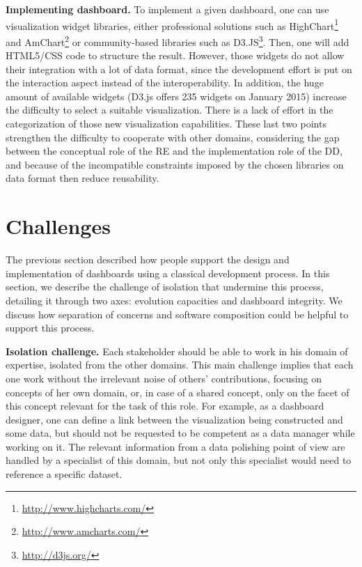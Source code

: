 \documentclass{acm_proc_article-sp}
\begin{document}
\textbf{Implementing dashboard.}
To implement a given dashboard, one can use visualization widget
libraries, either professional solutions such as
HighChart\footnote{\url{http://www.highcharts.com/}} and
AmChart\footnote{\url{http://www.amcharts.com/}} or com\-munity-based
libraries such as D3.JS\footnote{\url{http://d3js.org/}}. Then, one
will add HTML5/CSS code to structure the result.
However, those widgets do not allow their integration with a lot of
data format, since the development effort is put on the interaction
aspect instead of the interoperability. In addition, the huge amount
of available widgets (\eg D3.js offers 235 widgets on January 2015)
increase the difficulty to select a suitable visualization. There is 
a lack of effort in the categorization of those new visualization
capabilities\cite{ecmfa}.  These last two points strengthen the
difficulty to cooperate with other domains, considering the gap
between the conceptual role of the RE and the implementation role of
the DD, and because of the incompatible constraints imposed by the chosen
libraries on data format then reduce reusability.

\section{Challenges}

The previous section described how people support the design and
implementation of dashboards using a classical development process. In
this section, we describe the challenge of isolation that undermine
this process, detailing it through two axes: evolution capacities and
dashboard integrity. We discuss how separation of concerns and
software composition could be helpful to support this process.


\textbf{Isolation challenge.}  Each stakeholder should be able to work
in his domain of expertise, isolated from the other domains. This main
challenge implies that each one work without the irrelevant noise of
others' contributions, focusing on concepts of her own domain, or, in
case of a shared concept, only on the facet of this concept relevant
for the task of this role.  For example, as a dashboard designer, one
can define a link between the visualization being constructed and some
data, but should not be requested to be competent as a data manager
while working on it.  The relevant information from a data polishing
point of view are handled by a specialist of this domain, but not only
this specialist would need to reference a specific dataset.
\end{document}
